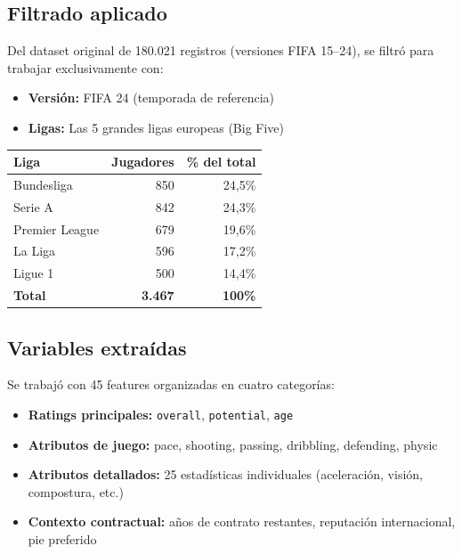 \documentclass[12pt,a4paper]{report}
\begin{document}
\subsection{Filtrado aplicado}

Del dataset original de 180.021 registros (versiones FIFA 15--24), se filtró para trabajar exclusivamente con:

\begin{itemize}
  \item \textbf{Versión:} FIFA 24 (temporada de referencia)
  \item \textbf{Ligas:} Las 5 grandes ligas europeas (Big Five)
\end{itemize}

\begin{center}
\begin{tabular}{lrr}
\toprule
\textbf{Liga} & \textbf{Jugadores} & \textbf{\% del total} \\
\midrule
Bundesliga     & 850  & 24{,}5\% \\
Serie A        & 842  & 24{,}3\% \\
Premier League & 679  & 19{,}6\% \\
La Liga        & 596  & 17{,}2\% \\
Ligue 1        & 500  & 14{,}4\% \\
\midrule
\textbf{Total} & \textbf{3.467} & \textbf{100\%} \\
\bottomrule
\end{tabular}
\end{center}

\subsection{Variables extraídas}

Se trabajó con 45 features organizadas en cuatro categorías:

\begin{itemize}
  \item \textbf{Ratings principales:} \texttt{overall}, \texttt{potential}, \texttt{age}
  \item \textbf{Atributos de juego:} pace, shooting, passing, dribbling, defending, physic
  \item \textbf{Atributos detallados:} 25 estadísticas individuales (aceleración, visión, compostura, etc.)
  \item \textbf{Contexto contractual:} años de contrato restantes, reputación internacional, pie preferido
\end{itemize}
\end{document}

